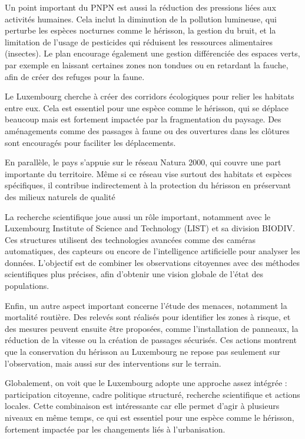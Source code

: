 \documentclass[a4paper,11pt]{article}
\begin{document}
Un point important du PNPN est aussi la réduction des pressions liées aux activités humaines. Cela inclut la diminution de la pollution lumineuse, qui perturbe les espèces nocturnes comme le hérisson, la gestion du bruit, et la limitation de l’usage de pesticides qui réduisent les ressources alimentaires (insectes). Le plan encourage également une gestion différenciée des espaces verts, par exemple en laissant certaines zones non tondues ou en retardant la fauche, afin de créer des refuges pour la faune.

Le Luxembourg cherche à créer des corridors écologiques pour relier les habitats entre eux. Cela est essentiel pour une espèce comme le hérisson, qui se déplace beaucoup mais est fortement impactée par la fragmentation du paysage. Des aménagements comme des passages à faune ou des ouvertures dans les clôtures sont encouragés pour faciliter les déplacements.

En parallèle, le pays s’appuie sur le réseau Natura 2000, qui couvre une part importante du territoire. Même si ce réseau vise surtout des habitats et espèces spécifiques, il contribue indirectement à la protection du hérisson en préservant des milieux naturels de qualité

La recherche scientifique joue aussi un rôle important, notamment avec le Luxembourg Institute of Science and Technology (LIST) et sa division BIODIV. Ces structures utilisent des technologies avancées comme des caméras automatiques, des capteurs ou encore de l’intelligence artificielle pour analyser les données. L’objectif est de combiner les observations citoyennes avec des méthodes scientifiques plus précises, afin d’obtenir une vision globale de l’état des populations.

Enfin, un autre aspect important concerne l’étude des menaces, notamment la mortalité routière. Des relevés sont réalisés pour identifier les zones à risque, et des mesures peuvent ensuite être proposées, comme l’installation de panneaux, la réduction de la vitesse ou la création de passages sécurisés. Ces actions montrent que la conservation du hérisson au Luxembourg ne repose pas seulement sur l’observation, mais aussi sur des interventions sur le terrain.

Globalement, on voit que le Luxembourg adopte une approche assez intégrée : participation citoyenne, cadre politique structuré, recherche scientifique et actions locales. Cette combinaison est intéressante car elle permet d’agir à plusieurs niveaux en même temps, ce qui est essentiel pour une espèce comme le hérisson, fortement impactée par les changements liés à l’urbanisation.
\end{document}
